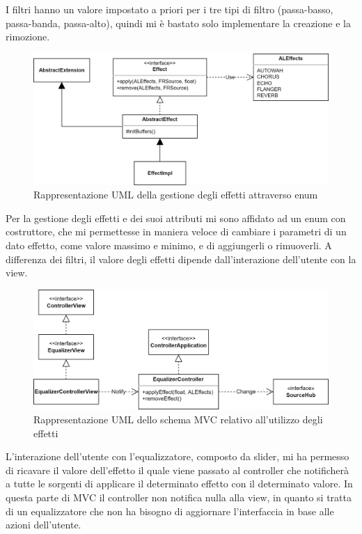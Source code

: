 \documentclass[a4paper,12pt]{report}
\begin{document}
I filtri hanno un valore impostato a priori per i tre tipi di filtro (passa-basso, passa-banda, passa-alto), quindi mi è bastato solo implementare la creazione e la rimozione. 
%
\begin{figure}[H]
\centering{}
\includegraphics[width=\textwidth]{img/Effect.png}
\caption{Rappresentazione UML della gestione degli effetti attraverso enum}
\label{img:effects}
\end{figure}
Per la gestione degli effetti e dei suoi attributi mi sono affidato ad un enum con costruttore, che mi permettesse in maniera veloce di cambiare i parametri di un dato effetto, come valore massimo e minimo, e di aggiungerli o rimuoverli. A differenza dei filtri, il valore degli effetti dipende dall’interazione dell’utente con la view.
%
\begin{figure}[H]
\centering{}
\includegraphics[width=\textwidth]{img/EffectsMVC.png}
\caption{Rappresentazione UML dello schema MVC relativo all’utilizzo degli effetti}
\label{img:effectsmvc}
\end{figure}
L’interazione dell’utente con l’equalizzatore, composto da slider, mi ha permesso di ricavare il valore dell’effetto il quale viene passato al controller che notificherà a tutte le sorgenti di applicare il determinato effetto con il determinato valore. In questa parte di MVC il controller non notifica nulla alla view, in quanto si tratta di un equalizzatore che non ha bisogno di aggiornare l’interfaccia in base alle azioni dell’utente.
%
\end{document}

